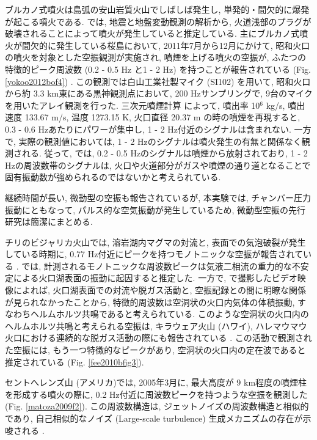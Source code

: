 \documentclass[12pt]{article}
\begin{document}
ブルカノ式噴火は島弧の安山岩質火山でしばしば発生し, 単発的・間欠的に爆発が起こる噴火である. \cite{Iguchi2008}では, 地震と地盤変動観測の解析から, 火道浅部のプラグが破壊されることによって噴火が発生していると推定している.
主にブルカノ式噴火が間欠的に発生している桜島において, 2011年7月から12月にかけて, 昭和火口の噴火を対象とした空振観測が実施され, 噴煙を上げる噴火の空振が, ふたつの特徴的ピーク周波数 (0.2 - 0.5 Hz と1 - 2 Hz) を持つことが報告されている (Fig. \ref{yokoo2012bof4}) \citep{yokoo2012bo}. この観測では白山工業社製マイク (SI102) を用いて, 昭和火口から約 3.3 km東にある黒神観測点において, 200 Hzサンプリングで, 9台のマイクを用いたアレイ観測を行った.
三次元噴煙計算 \citep{Suzuki2005} によって, 噴出率 10$^6$ kg/s, 噴出速度 133.67 m/s, 温度 1273.15 K, 火口直径 20.37 m の時の噴煙を再現すると, 0.3 - 0.6 Hzあたりにパワーが集中し, 1 - 2 Hz付近のシグナルは含まれない. 
一方で, 実際の観測値においては, 1 - 2 Hzのシグナルは噴火発生の有無と関係なく観測される. 従って, \cite{yokoo2012bo} では, 0.2 - 0.5 Hzのシグナルは噴煙から放射されており, 1 - 2 Hzの周波数帯のシグナルは, 火口や火道部分がガスや噴煙の通り道となることで固有振動数が強められるのではないかと考えられている. 

継続時間が長い, 微動型の空振も報告されているが, 本実験では, チャンバー圧力振動にともなって, パルス的な空気振動が発生しているため, 微動型空振の先行研究は簡潔にまとめる. 

チリのビジャリカ火山では, 溶岩湖内マグマの対流と, 表面での気泡破裂が発生している時期に, 0.77 Hz付近にピークを持つモノトニックな空振が報告されている \citep{Ripepe2010b, Goto2011}. 
\cite{Ripepe2010b}では, 計測されるモノトニックな周波数ピークは気液二相流の重力的な不安定による火口湖表面の振動に起因すると推定した. %
一方で, \cite{Goto2011}で撮影したビデオ映像によれば, 火口湖表面での対流や脱ガス活動と, 空振記録との間に明瞭な関係が見られなかったことから, 特徴的周波数は空洞状の火口内気体の体積振動, すなわちヘルムホルツ共鳴であると考えられている. %
このような空洞状の火口内のヘルムホルツ共鳴と考えられる空振は, キラウェア火山 (ハワイ), ハレマウマウ火口における連続的な脱ガス活動の際にも報告されている \cite{Fee2010c}. 
この活動で観測された空振には, もう一つ特徴的なピークがあり, 空洞状の火口内の定在波であると推定されている (Fig. \ref{fee2010bfig3}). 

セントへレンズ山 (アメリカ)では, 2005年3月に, 最大高度が 9 km程度の噴煙柱を形成する噴火の際に, 0.2 Hz付近に周波数ピークを持つような空振を観測した (Fig. \ref{matoza2009f2}). 
この周波数構造は, ジェットノイズの周波数構造と相似的であり, 自己相似的なノイズ (Large-scale turbulence) 生成メカニズムの存在が示唆される \citep{Matoza2009a}.
\end{document}
